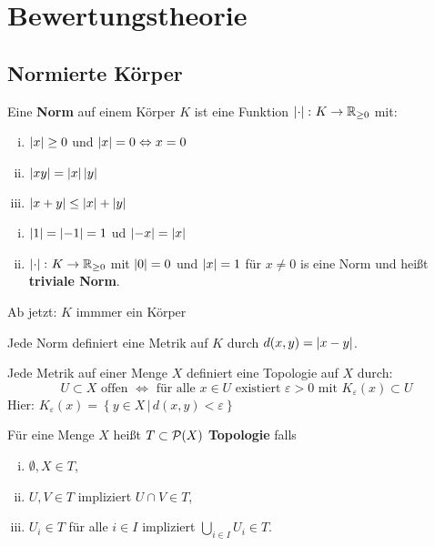 
\chapter{Bewertungstheorie}
\section{Normierte Körper}

\begin{defi}
Eine \textbf{Norm} auf einem Körper $K$ ist eine Funktion
$\left|{\cdot}\right| \colon K \to \mathbb{R}_{\geq 0}$ mit:
\begin{enumerate}[(i)]
\item $\left|{x}\right| \geq 0$ und $\left|{x}\right| = 0 \Leftrightarrow x = 0$
\item $\left|{xy}\right| = \left|{x}\right| \left|{y}\right|$
\item $\left|{x+y}\right| \leq \left|{x}\right| + \left|{y}\right|$
\end{enumerate}
\end{defi}

\begin{Bem}
\begin{enumerate}[(i)]
\item $\left|{1}\right| = \left|{-1}\right| = 1$ ud $\left|{-x}\right| = \left|{x}\right|$
\item $\left|{\cdot}\right| \colon K \to \mathbb{R}_{\geq 0}$ mit $\left|{0}\right| = 0$ und $\left|{x}\right| = 1$ für $x\neq 0$ is eine Norm und heißt \textbf{triviale Norm}.
\end{enumerate}
\end{Bem}

Ab jetzt: $K$ immmer ein Körper

\begin{Bem}
Jede Norm definiert eine Metrik auf $K$ durch $d(x,y) = \left|{x-y}\right|$.
\end{Bem}

\begin{Bem}
Jede Metrik auf einer Menge $X$ definiert eine Topologie auf $X$ durch:
\[ U \subset X \text{ offen } \Leftrightarrow \text{ für alle }  x \in U \text{ existiert } \varepsilon > 0
\text{ mit } K_\varepsilon(x) \subset U \]
Hier: $K_\varepsilon(x) = \left\{ y \in X \, | \, d(x,y) < \varepsilon  \right\}$
\end{Bem}

\begin{recall*}
Für eine Menge $X$ heißt $T \subset \mathcal{P}(X)$ \textbf{Topologie} falls
\begin{enumerate}[(i)]
\item $\emptyset, X \in T$,
\item $U, V \in T$ impliziert $U \cap V \in T$,
\item $U_i \in T$ für alle $i \in I$ impliziert $\bigcup_{i \in I} U_i \in T$.
\end{enumerate}
\end{recall*}


